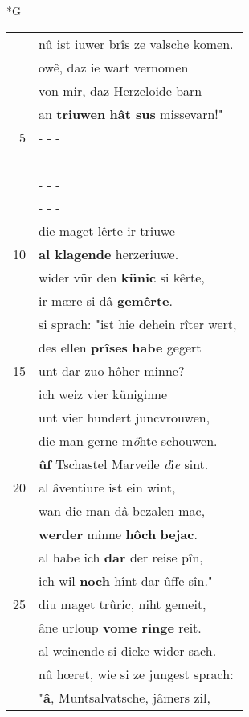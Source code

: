 \documentclass[8pt,a4paper,notitlepage]{article}
\begin{document}
\begin{table}[ht]
\begin{minipage}[t]{0.5\linewidth}
\small
\begin{center}*G
\end{center}
\begin{tabular}{rl}
 & nû ist iuwer brîs ze valsche komen.\\ 
 & owê, daz ie wart vernomen\\ 
 & von mir, daz Herzeloide barn\\ 
 & an \textbf{triuwen} \textbf{hât sus} missevarn!"\\ 
5 & \multicolumn{1}{l}{ - - - }\\ 
 & \multicolumn{1}{l}{ - - - }\\ 
 & \multicolumn{1}{l}{ - - - }\\ 
 & \multicolumn{1}{l}{ - - - }\\ 
 & die maget lêrte ir triuwe\\ 
10 & \textbf{al klagende} herzeriuwe.\\ 
 & wider vür den \textbf{künic} si kêrte,\\ 
 & ir mære si dâ \textbf{gemêrte}.\\ 
 & si sprach: "ist hie dehein rîter wert,\\ 
 & des ellen \textbf{prîses} \textbf{habe} gegert\\ 
15 & unt dar zuo hôher minne?\\ 
 & ich weiz vier küniginne\\ 
 & unt vier hundert juncvrouwen,\\ 
 & die man gerne m\textit{ö}hte schouwen.\\ 
 & \textbf{ûf} Tschastel Marveile \textit{d}i\textit{e} sint.\\ 
20 & al âventiure ist ein wint,\\ 
 & wan die man dâ bezalen mac,\\ 
 & \textbf{werder} minne \textbf{hôch} \textbf{bejac}.\\ 
 & al habe ich \textbf{dar} der reise pîn,\\ 
 & ich wil \textbf{noch} hînt dar ûffe sîn."\\ 
25 & diu maget trûric, niht gemeit,\\ 
 & âne urloup \textbf{vome ringe} reit.\\ 
 & al weinende si dicke wider sach.\\ 
 & nû hœret, wie si ze jungest sprach:\\ 
 & "\textbf{â}, Muntsalvatsche, jâmers zil,\\ 

\end{tabular}
\end{minipage}
\end{table}
\end{document}
